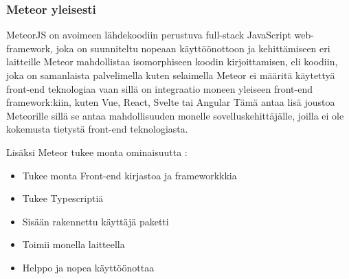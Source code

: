 



\subsubsection{Meteor yleisesti}








MeteorJS on avoimeen lähdekoodiin perustuva full-stack JavaScript web-framework, joka on 
suunniteltu nopeaan käyttöönottoon ja kehittämiseen eri laitteille 
Meteor mahdollistaa isomorphiseen koodin kirjoittamisen, eli koodiin, joka on samanlaista palvelimella kuten selaimella %
Meteor ei määritä käytettyä front-end teknologiaa vaan sillä on integraatio moneen yleiseen front-end framework:kiin, kuten Vue, React, Svelte tai Angular 
Tämä antaa lisä joustoa Meteorille sillä se antaa mahdollisuuden monelle sovelluskehittäjälle, joilla ei ole kokemusta tietystä front-end teknologiasta.\\
\medskip



    

Lisäksi Meteor tukee monta ominaisuutta :
\begin{itemize}
    \item Tukee monta Front-end kirjastoa ja frameworkkkia
    \item Tukee Typescriptiä
    \item Sisään rakennettu käyttäjä paketti
    \item Toimii monella laitteella
    \item Helppo ja nopea käyttöönottaa 
\end{itemize}
\medskip




